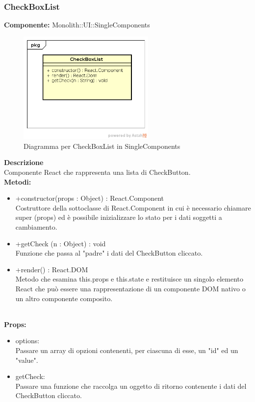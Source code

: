 \clearpage

\subsubsection{CheckBoxList}
\textbf{Componente:}  Monolith::UI::SingleComponents\\
   \FloatBarrier
   \begin{figure}[ht]
   \centering
   \includegraphics[width=0.6\textwidth]{img/single-CheckBoxList}
   \caption{{Diagramma per CheckBoxList in SingleComponents}}
\end{figure}
\FloatBarrier
\textbf{Descrizione}\\
Componente React che rappresenta una lista di CheckButton. \\
\textbf{Metodi:} 
\begin{itemize}
\item +constructor(props : Object) : React.Component 
\\
Costruttore della sottoclasse di React.Component in cui è necessario chiamare super (props) ed è possibile inizializzare lo stato per i dati soggetti a cambiamento.

\item +getCheck (n : Object) : void \\
Funzione che passa al "padre" i dati del CheckButton cliccato. 

\item +render() : React.DOM 
\\
Metodo che esamina this.props e this.state e restituisce un singolo elemento React che può essere una rappresentazione di un componente DOM nativo o un altro componente composito.

\end{itemize}
\\
\textbf{Props:} 
\begin{itemize}
\item options: 
\\
Passare un array di opzioni contenenti, per ciascuna di esse, un "id" ed un "value".
\item getCheck: 
\\
Passare una funzione che raccolga un oggetto di ritorno contenente i dati del CheckButton cliccato.

\end{itemize} 


